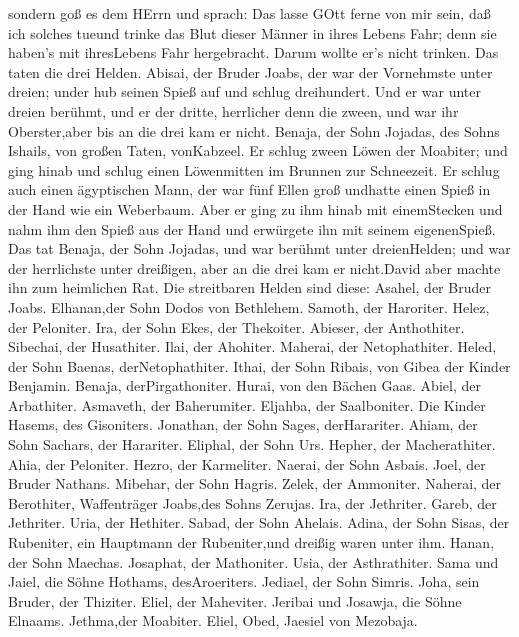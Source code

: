 sondern goß es dem HErrn  und sprach: Das lasse GOtt ferne
von mir sein, daß ich solches tueund trinke das Blut dieser Männer in
ihres Lebens Fahr; denn sie haben's mit ihresLebens Fahr hergebracht.
Darum wollte er's nicht trinken. Das taten die drei Helden.
 Abisai, der Bruder Joabs, der war der Vornehmste unter
dreien; under hub seinen Spieß auf und schlug dreihundert. Und er war
unter dreien berühmt,  und er der dritte, herrlicher denn
die zween, und war ihr Oberster,aber bis an die drei kam er nicht.
 Benaja, der Sohn Jojadas, des Sohns Ishails, von großen
Taten, vonKabzeel. Er schlug zween Löwen der Moabiter; und ging hinab
und schlug einen Löwenmitten im Brunnen zur Schneezeit.  Er
schlug auch einen ägyptischen Mann, der war fünf Ellen groß undhatte
einen Spieß in der Hand wie ein Weberbaum. Aber er ging zu ihm hinab mit
einemStecken und nahm ihm den Spieß aus der Hand und erwürgete ihn mit
seinem eigenenSpieß.  Das tat Benaja, der Sohn Jojadas, und
war berühmt unter dreienHelden;  und war der herrlichste
unter dreißigen, aber an die drei kam er nicht.David aber machte ihn zum
heimlichen Rat.  Die streitbaren Helden sind diese: Asahel,
der Bruder Joabs. Elhanan,der Sohn Dodos von Bethlehem. 
Samoth, der Haroriter. Helez, der Peloniter.  Ira, der Sohn
Ekes, der Thekoiter. Abieser, der Anthothiter.  Sibechai,
der Husathiter. Ilai, der Ahohiter.  Maherai, der
Netophathiter. Heled, der Sohn Baenas, derNetophathiter. 
Ithai, der Sohn Ribais, von Gibea der Kinder Benjamin. Benaja,
derPirgathoniter.  Hurai, von den Bächen Gaas. Abiel, der
Arbathiter.  Asmaveth, der Baherumiter. Eljahba, der
Saalboniter.  Die Kinder Hasems, des Gisoniters. Jonathan,
der Sohn Sages, derHarariter.  Ahiam, der Sohn Sachars, der
Harariter. Eliphal, der Sohn Urs.  Hepher, der
Macherathiter. Ahia, der Peloniter.  Hezro, der Karmeliter.
Naerai, der Sohn Asbais.  Joel, der Bruder Nathans.
Mibehar, der Sohn Hagris.  Zelek, der Ammoniter. Naherai,
der Berothiter, Waffenträger Joabs,des Sohns Zerujas.  Ira,
der Jethriter. Gareb, der Jethriter.  Uria, der Hethiter.
Sabad, der Sohn Ahelais.  Adina, der Sohn Sisas, der
Rubeniter, ein Hauptmann der Rubeniter,und dreißig waren unter ihm.
 Hanan, der Sohn Maechas. Josaphat, der Mathoniter.
 Usia, der Asthrathiter. Sama und Jaiel, die Söhne Hothams,
desAroeriters.  Jediael, der Sohn Simris. Joha, sein
Bruder, der Thiziter.  Eliel, der Maheviter. Jeribai und
Josawja, die Söhne Elnaams. Jethma,der Moabiter.  Eliel,
Obed, Jaesiel von Mezobaja.

